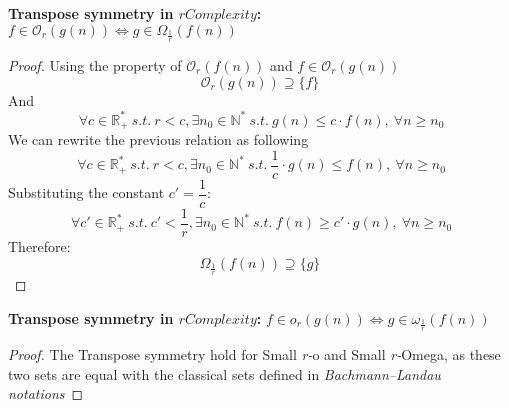 \begin{theorem} 
 \textbf{Transpose symmetry in $rComplexity$:}  \\  $ f \in \mathcal{O}_{r}(g(n)) \Leftrightarrow g \in \Omega_{\frac{1}{r}}(f(n)) $
 \end{theorem} 

\begin{proof} 
Using the property of $ \mathcal{O}_{r}(f(n))$ and $f \in \mathcal{O}_{r}(g(n))$
  \[\mathcal{O}_{r}(g(n)) \supseteq \lbrace f \rbrace \]
  And 
  \[ \ \forall c  \in \mathbb{R}^{*}_{+} \ s.t.\  r<c, \exists n_{0} \in \mathbb{N}^{*}\ s.t.\  g(n) \leq c \cdot f(n),\  \forall n \geq n_{0} \]
  We can rewrite the previous relation as following
    \[ \ \forall c  \in \mathbb{R}^{*}_{+} \ s.t.\  r<c, \exists n_{0} \in \mathbb{N}^{*}\ s.t.\  \dfrac{1}{c} \cdot g(n) \leq f(n),\  \forall n \geq n_{0} \]
  Substituting the constant $ c' = \dfrac{1}{c}$: 
      \[ \ \forall c'  \in \mathbb{R}^{*}_{+} \ s.t.\  c' < \dfrac{1}{r}, \exists n_{0} \in \mathbb{N}^{*}\ s.t.\  f(n) \geq c' \cdot g(n) ,\  \forall n \geq n_{0} \]
  Therefore:
  \[\Omega_{\frac{1}{r}}(f(n)) \supseteq \lbrace g \rbrace \]
\end{proof} 
\begin{theorem} \textbf{Transpose symmetry in $rComplexity$:} 
  $ f \in o_{r}(g(n)) \Leftrightarrow g \in \omega_{\frac{1}{r}}(f(n)) $
\end{theorem} 

\begin{proof} 
The Transpose symmetry hold for Small \textit{r-}o and Small \textit{r-}Omega, as these two sets are equal with the classical sets defined in \textit{Bachmann–Landau notations}
\end{proof} 

